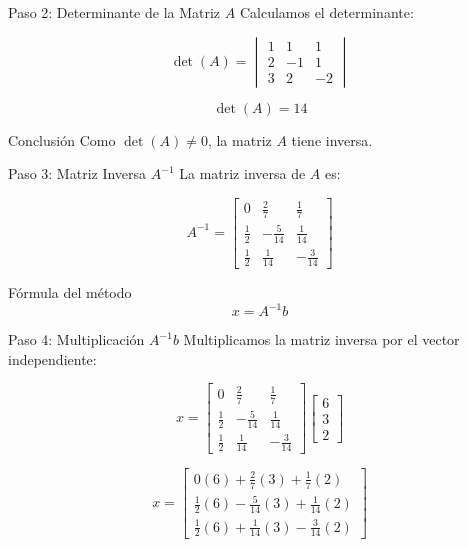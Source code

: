 \documentclass[10pt, aspectratio=169]{beamer}
\begin{document}
	\begin{frame}{Paso 2: Determinante de la Matriz $A$}
		Calculamos el determinante:
		
		\[
		\det(A)=
		\begin{vmatrix}
			1 & 1 & 1\\
			2 & -1 & 1\\
			3 & 2 & -2
		\end{vmatrix}
		\]
		
		\pause
		
		\[
		\det(A)=14
		\]
		
		\vspace{0.5cm}
		
		\begin{block}{Conclusión}
			Como $\det(A)\neq 0$, la matriz $A$ tiene inversa.
		\end{block}
	\end{frame}
	
	\begin{frame}{Paso 3: Matriz Inversa $A^{-1}$}
		La matriz inversa de $A$ es:
		
		\[
		A^{-1}=
		\begin{bmatrix}
			0 & \frac{2}{7} & \frac{1}{7}\\
			\frac{1}{2} & -\frac{5}{14} & \frac{1}{14}\\
			\frac{1}{2} & \frac{1}{14} & -\frac{3}{14}
		\end{bmatrix}
		\]
		
		\vspace{0.5cm}
		
		\begin{block}{Fórmula del método}
			\[
			x=A^{-1}b
			\]
		\end{block}
	\end{frame}
	
	\begin{frame}{Paso 4: Multiplicación $A^{-1}b$}
		Multiplicamos la matriz inversa por el vector independiente:
		
		\[
		x=
		\begin{bmatrix}
			0 & \frac{2}{7} & \frac{1}{7}\\
			\frac{1}{2} & -\frac{5}{14} & \frac{1}{14}\\
			\frac{1}{2} & \frac{1}{14} & -\frac{3}{14}
		\end{bmatrix}
		\begin{bmatrix}
			6\\3\\2
		\end{bmatrix}
		\]
		
		\pause
		
		\[
		x=
		\begin{bmatrix}
			0(6)+\frac{2}{7}(3)+\frac{1}{7}(2)\\
			\frac{1}{2}(6)-\frac{5}{14}(3)+\frac{1}{14}(2)\\
			\frac{1}{2}(6)+\frac{1}{14}(3)-\frac{3}{14}(2)
		\end{bmatrix}
		\]
	\end{frame}
	
\end{document}
